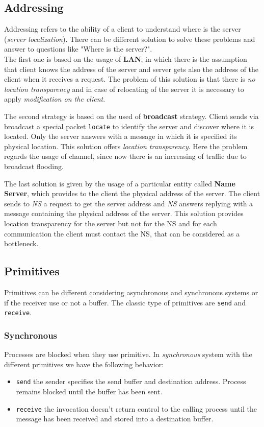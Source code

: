 \documentclass[11pt,a4paper]{article}
\begin{document}
\subsection{Addressing}
Addressing refers to the ability of a client to understand where is the server (\textit{server localization}). There can be different solution to solve these problems and answer to questions like "Where is the server?". \\
The first one is based on the usage of \textbf{LAN}, in which there is the assumption that client knows the address of the server and server gets also the address of the client when it receives a request.
The problem of this solution is that there is \textit{no location transparency} and in case of relocating of the server it is necessary to apply \textit{modification on the client}.
\par \medskip \noindent
The second strategy is based on the used of \textbf{broadcast} strategy. Client sends via broadcast a special packet \verb!locate! to identify the server and discover where it is located. Only the server answers with a message in which it is specified its physical location. This solution offers \textit{location transparency}.
Here the problem regards the usage of channel, since now there is an increasing of traffic due to broadcast flooding.
\par \medskip \noindent
The last solution is given by the usage of a particular entity called \textbf{Name Server}, which provides to the client the physical address of the server. The client sends to \textit{NS} a request to get the server address and \textit{NS} answers replying with a message containing the physical address of the server.
This solution provides location transparency for the server but not for the NS and for each communication the client must contact the NS, that can be considered as a bottleneck.

\subsection{Primitives}
Primitives can be different considering asynchronous and synchronous systems or if the receiver use or not a buffer. The classic type of primitives are \verb!send! and \verb!receive!.
\subsubsection{Synchronous}
Processes are blocked when they use primitive. In \textit{synchronous} system with the different primitives we have the following behavior:
\begin{itemize}
	\item \verb!send! the sender specifies the send buffer and destination address. Process remains blocked until the buffer has been sent. 
	\item \verb!receive! the invocation doesn't return control to the calling process until the message has been received and stored into a destination buffer.
\end{itemize}
\end{document}
